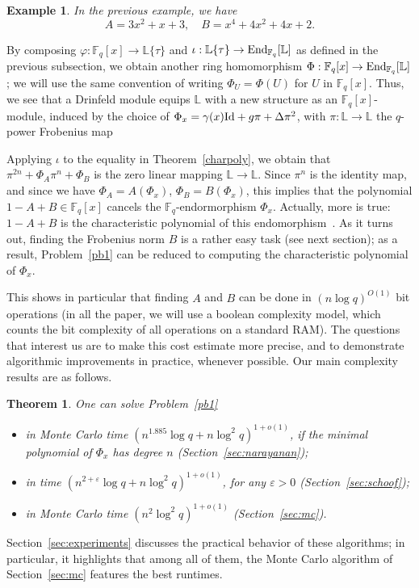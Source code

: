 \documentclass[sigconf]{acmart}
\newtheorem{theorem}{Theorem}
\newtheorem{example}{Example}
\newcommand{\F}{\mathbb{F}}
\renewcommand{\L}{\mathbb{L}}
\newcommand{\ang}[1]{\{#1\}}
\begin{document}
\begin{example}
In the previous example, we have 
$$A = 3x^2+x+3, \quad B =x^4+4x^2+4x+2.$$
\end{example}

By composing $\varphi: \F_q[x]\to \L\ang{\tau}$ and
$\iota:\L\ang{\tau} \to {\rm End}_{\F_q}[\L]$ as defined in the
previous subsection, we obtain another ring homomorphism $\Phi:
\F_q[x]\to {\rm End}_{\F_q}[\L]$; we will use the same convention of
writing $\Phi_U=\Phi(U)$ for $U$ in $\F_q[x]$. Thus, we see that a
Drinfeld module equips $\L$ with a new structure as an
$\F_q[x]$-module, induced by the choice of $\Phi_x = \gamma(x) {\rm
  Id} + g \pi + \Delta \pi^2$, with $\pi:\L \to \L$ the $q$-power Frobenius map

Applying $\iota$ to the equality in Theorem~\ref{charpoly}, we obtain
that $\pi^{2n} + \Phi_A \pi^n + \Phi_B$ is the zero linear mapping $\L
\to \L$. Since $\pi^{n}$ is the identity map, and since we have
$\Phi_A = A(\Phi_x)$, $\Phi_B = B(\Phi_x)$, this implies that the
polynomial $1-A+B \in \F_q[x]$ cancels the $\F_q$-endormorphism
$\Phi_x$. Actually, more is true: $1-A+B$ is the characteristic
polynomial of this endomorphism~\cite[Th.~5.1]{GEKELE1991187}.  As it
turns out, finding the Frobenius norm $B$ is a rather easy task (see
next section); as a result, Problem~\ref{pb1} can be reduced to
computing the characteristic polynomial of $\Phi_x$.

This shows in particular that finding $A$ and $B$ can be done in $(n
\log q)^{O(1)}$ bit operations (in all the paper, we will use a
boolean complexity model, which counts the bit complexity of all
operations on a standard RAM). The questions that interest us are to
make this cost estimate more precise, and to demonstrate algorithmic
improvements in practice, whenever possible. Our main complexity
results are as follows.

\begin{theorem}\label{theo:main}
One can solve Problem~\ref{pb1}
\begin{itemize}
\item in Monte Carlo time $(n^{1.885} \log q + n \log^2 q)^{1+o(1)}$,
  if the minimal polynomial of $\Phi_x$ has degree $n$ (Section~\ref{sec:narayanan});
\item in time $(n^{2+\varepsilon} \log q + n \log^2 q)^{1+o(1)}$, for
  any $\varepsilon > 0$ (Section~\ref{sec:schoof});
\item in Monte Carlo time $(n^2 \log^2 q)^{1+o(1)}$ (Section~\ref{sec:mc}).
\end{itemize}
\end{theorem}
Section~\ref{sec:experiments} discusses the practical behavior of
these algorithms; in particular, it highlights that among all of them,
the Monte Carlo algorithm of Section~\ref{sec:mc} features the best runtimes.
\end{document}
